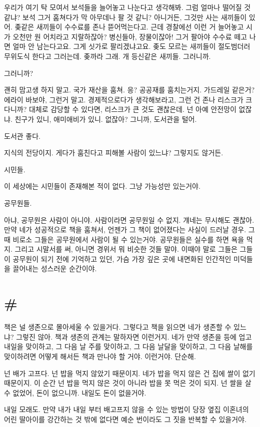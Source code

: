 \documentclass[a5paper,10pt, twoside, openright]{memoir}
\begin{document}
	우리가 여기 탁 모여서 보석들을 늘어놓고 나눈다고 생각해봐. 그럼 얼마나 떨어질 것 같냐? 보석 그거 훔쳐다가 막 아무데나 팔 것 같니? 아니거든, 그것만 사는 새끼들이 있어. 좆같은 새끼들이 수수료를 존나 뜯어먹는다고. 근데 경찰에선 이런 거 늘어놓고 시가 오천만 원 어치라고 지랄하잖아? 병신들아, 장물이잖아! 그거 팔아야 수수료 떼고 나면 얼마 안 남는다고요. 그게 싯가로 팔리겠냐고요. 좆도 모르는 새끼들이 절도범더러 무위도식 한다고 그러는데. 좆까라 그래. 개 등신같은 새끼들. 그러니까. 

	그러니까? 
	
	괜히 맘고생 하지 말고. 국가 재산을 훔쳐. 응? 공공재를 훔치는거지. 가드레일 같은거? 에라이 바보야, 그런거 말고. 경제적으로다가 생각해보라고, 그런 건 존나 리스크가 크다니까? 대체로 감당할 수 있다면, 리스크가 큰 것도 괜찮은데.  넌 아예 안전망이 없잖냐. 친구가 있니, 애미애비가 있니. 없잖아? 그니까, 도서관을 털어. 
	
	도서관 좋다. 
	
	지식의 전당이지. 게다가 훔친다고 피해볼 사람이 있느냐? 그렇지도 않거든. 
	
	시민들.
	
	이 세상에는 시민들이 존재해본 적이 없다. 그냥 가능성만 있는거야.

	공무원들. 

	아냐, 공무원은 사람이 아니야. 사람이라면 공무원일 수 없지. 걔네는 무시해도 괜찮아. 만약 네가 성공적으로 책을 훔쳐서, 언젠가 그 책이 없어졌다는 사실이 드러날 경우. 그때 비로소 그들은 공무원에서 사람이 될 수 있는거야. 공무원들은 실수를 하면 욕을 먹지. 그리고 시말서를 써, 아니면 경위서 뭐 비슷한 것들 말야. 이때야 말로 그들은 그들이 공무원이 되기 전에 기억하고 있던, 가슴 가장 깊은 곳에 내면화된 인간적인 미덕들을 끌어내는 성스러운 순간이야.

	\section{\#}
	책은 널 생존으로 몰아세울 수 있을거다. 그렇다고 책을 읽으면 네가 생존할 수 있느냐? 그렇진 않아. 책과 생존의 관계는 말하자면 이런거지. 네가 만약 생존을 등에 업고 내일을 맞이하고, 그 다음 날 주를 맞이하고, 그 다음 날달을 맞이하고, 그 다음 날해를 맞이하려면 어떻게 해서든 책과 만나야 할 거야. 이런거야. 단순해. 

	넌 배가 고프다. 넌 밥을 먹지 않았기 때문이지. 네가 밥을 먹지 않은 건 집에 쌀이 없기 때문이지. 이 순간 넌 밥을 먹지 않은 것이 아니라 밥을 못 먹은 것이 되지. 넌 쌀을 살 수 없었어, 돈이 없으니까. 내일도 돈이 없을거야. 

	내일 모래도. 만약 내가 내일 부터 배고프지 않을 수 있는 방법이 당장 옆집 이혼녀의 어린 딸아이를 강간하는 것 밖에 없다면 예순 번이라도 그 짓을 반복할 수 있을거야. 
\end{document}
